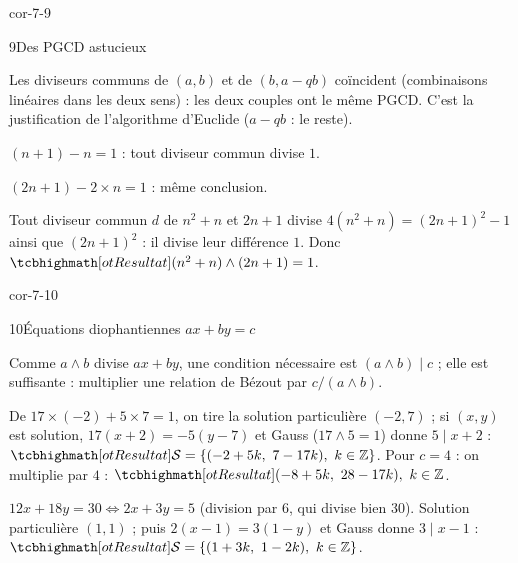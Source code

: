\begin{blocLivre}{cor-7-9}
\begin{corrige}{9}{Des PGCD astucieux}
\begin{questions}
  \item Les diviseurs communs de $(a,b)$ et de $(b,a-qb)$ coïncident
    (combinaisons linéaires dans les deux sens) : les deux couples ont le
    même PGCD. C'est la justification de l'algorithme d'Euclide
    ($a-qb$ : le reste).
  \item $(n+1)-n=1$ : tout diviseur commun divise $1$.
  \item $(2n+1)-2\times n=1$ : même conclusion.
  \item Tout diviseur commun $d$ de $n^{2}+n$ et $2n+1$ divise
    $4(n^{2}+n)=(2n+1)^{2}-1$ ainsi que $(2n+1)^{2}$ : il divise leur
    différence $1$. Donc $\res{(n^{2}+n)\wedge(2n+1)=1}$.
\end{questions}
\end{corrige}
\end{blocLivre}

\begin{blocLivre}{cor-7-10}
\begin{corrige}{10}{Équations diophantiennes $ax+by=c$}
\begin{questions}
  \item Comme $a\wedge b$ divise $ax+by$, une condition nécessaire est
    $(a\wedge b)\mid c$ ; elle est suffisante : multiplier une relation de
    Bézout par $c/(a\wedge b)$.
  \item De $17\times(-2)+5\times7=1$, on tire la solution particulière
    $(-2,7)$ ; si $(x,y)$ est solution, $17(x+2)=-5(y-7)$ et Gauss
    ($17\wedge5=1$) donne $5\mid x+2$ :
    $\res{\mathcal{S}=\ens{(-2+5k,\ 7-17k),\ k\in\Z}}$.
    Pour $c=4$ : on multiplie par $4$ :
    $\res{(-8+5k,\ 28-17k),\ k\in\Z}$.
  \item $12x+18y=30\iff2x+3y=5$ (division par $6$, qui divise bien $30$).
    Solution particulière $(1,1)$ ; puis $2(x-1)=3(1-y)$ et Gauss donne
    $3\mid x-1$ :
    $\res{\mathcal{S}=\ens{(1+3k,\ 1-2k),\ k\in\Z}}$.
\end{questions}
\end{corrige}
\end{blocLivre}

